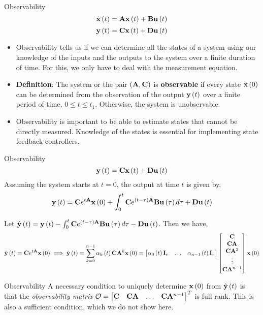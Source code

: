 \documentclass[aspectratio=169]{beamer}
\def\mf{\ensuremath\mathbf}
\def\lp{\ensuremath\left(}
\def\rp{\ensuremath\right)}
\def\bmx{\ensuremath\begin{bmatrix*}[r]}
\def\emx{\ensuremath\end{bmatrix*}}
\def\bmxc{\ensuremath\begin{bmatrix*}[c]}
\newcommand{\ct}[1]{\lp #1\rp}
\begin{document}
\begin{frame}[t]{Observability}
\[ \dot{\mf{x}}\ct{t} = \mf{A}\mf{x}\ct{t} + \mf{B}\mf{u}\ct{t} \]
\[ \mf{y}\ct{t} = \mf{C}\mf{x}\ct{t} + \mf{D}\mf{u}\ct{t} \]
\vspace{-0.5cm}
\begin{itemize}
    \item Observability tells us if we can determine all the states of a system using our knowledge of the inputs and the outputs to the system over a finite duration of time. For this, we only have to deal with the measurement equation.
    
    \item \textbf{Definition}: The system or the pair $\ct{\mf{A}, \mf{C}}$ is \textbf{observable} if every state $\mf{x}\ct{0}$ can be determined from the observation of the output $\mf{y}\ct{t}$ over a finite period of time, $0 \leq t \leq t_1$. Otherwise, the system is unobservable.

    \item Observability is important to be able to estimate states that cannot be directly measured. Knowledge of the states is essential for implementing state feedback controllers.
\end{itemize}
\end{frame}


\begin{frame}[t]{Observability}
\[ \mf{y}\ct{t} = \mf{C}\mf{x}\ct{t} + \mf{D}\mf{u}\ct{t} \]
Assuming the system starts at $t=0$, the output at time $t$ is given by,\vspace{-0.15cm}
\[ \mf{y}\ct{t} = \mf{C}e^{t\mf{A}}\mf{x}\ct{0} + \int_{0}^{t} \mf{C}e^{\ct{t - \tau}\mf{A}}\mf{B}\mf{u}\ct{\tau}d\tau + \mf{D}\mf{u}\ct{t} \]

Let $\hat{\mf{y}}\ct{t} = \mf{y}\ct{t} - \int_{0}^{t} \mf{C}e^{\ct{t - \tau}\mf{A}}\mf{B}\mf{u}\ct{\tau}d\tau - \mf{D}\mf{u}\ct{t}$. Then we have,\vspace{-0.25cm}
\[ \hat{\mf{y}}\ct{t} = \mf{C}e^{t\mf{A}}\mf{x}\ct{0} \implies \hat{\mf{y}}\ct{t} = \sum_{k=0}^{n-1} \alpha_k\ct{t}\mf{C}\mf{A}^k\mf{x}\ct{0} =  \bmxc \alpha_0\ct{t}\mf{I}_{r} & \ldots & \alpha_{n-1}\ct{t}\mf{I}_{r} \emx \bmxc \mf{C} \\ \mf{C}\mf{A} \\ \mf{C}\mf{A}^2 \\ \vdots \\ \mf{C}\mf{A}^{n-1} \emx \mf{x}\ct{0}  \]
\end{frame}


\begin{frame}{Observability}
A necessary condition to uniquely determine $\mf{x}\ct{0}$ from $\tilde{\mf{y}}\ct{t}$ is that the \textit{observability matrix} $\mathcal{O} = \bmx \mf{C} & \mf{C}\mf{A} & \ldots & \mf{C}\mf{A}^{n-1} \emx^T$ is full rank. This is also a sufficient condition, which we do not show here.
\end{frame}
\end{document}
